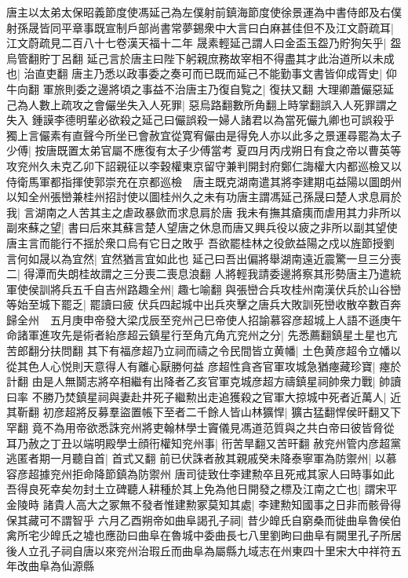 唐主以太弟太保昭義節度使馮延己為左僕射前鎮海節度使徐景運為中書侍郎及右僕射孫晟皆同平章事既宣制戶部尚書常夢錫衆中大言曰白麻甚佳但不及江文蔚疏耳|{
	江文蔚疏見二百八十七卷漢天福十二年}
晟素輕延己謂人曰金盃玉盌乃貯狗矢乎|{
	盌烏管翻貯丁呂翻}
延己言於唐主曰陛下躬親庶務故宰相不得盡其才此治道所以未成也|{
	治直吏翻}
唐主乃悉以政事委之奏可而已既而延己不能勤事文書皆仰成胥史|{
	仰牛向翻}
軍旅則委之邊將頃之事益不治唐主乃復自覧之|{
	復扶又翻}
大理卿蕭儼惡延己為人數上疏攻之會儼坐失入人死罪|{
	惡烏路翻數所角翻上時掌翻誤入人死罪謂之失入}
鍾謨李德明輩必欲殺之延己曰儼誤殺一婦人諸君以為當死儼九卿也可誤殺乎獨上言儼素有直聲今所坐已會赦宜從寛宥儼由是得免人亦以此多之景運尋罷為太子少傅|{
	按唐既置太弟官屬不應復有太子少傅當考}
夏四月丙戌朔日有食之帝以曹英等攻兖州久未克乙卯下詔親征以李穀權東京留守兼判開封府鄭仁誨權大内都巡檢又以侍衛馬軍都指揮使郭崇充在京都巡檢　唐主既克湖南遣其將李建期屯益陽以圖朗州以知全州張巒兼桂州招討使以圖桂州久之未有功唐主謂馮延己孫晟曰楚人求息肩於我|{
	言湖南之人苦其主之虐政暴歛而求息肩於唐}
我未有撫其瘡痍而虐用其力非所以副來蘇之望|{
	書曰后來其蘇言楚人望唐之休息而唐又興兵役以疲之非所以副其望使唐主言而能行不揺於衆口烏有它日之敗乎}
吾欲罷桂林之役歛益陽之戍以旌節授劉言何如晟以為宜然|{
	宜然猶言宜如此也}
延己曰吾出偏將舉湖南遠近震驚一旦三分喪二|{
	得潭而失朗桂故謂之三分喪二喪息浪翻}
人將輕我請委邊將察其形勢唐主乃遣統軍使侯訓將兵五千自吉州路趣全州|{
	趣七喻翻}
與張巒合兵攻桂州南漢伏兵於山谷巒等始至城下罷乏|{
	罷讀曰疲}
伏兵四起城中出兵夾擊之唐兵大敗訓死巒收散卒數百奔歸全州　五月庚申帝發大梁戊辰至兖州己巳帝使人招諭慕容彦超城上人語不遜庚午命諸軍進攻先是術者紿彦超云鎮星行至角亢角亢兖州之分|{
	先悉薦翻鎮星土星也亢苦郎翻分扶問翻}
其下有福彦超乃立祠而禱之令民間皆立黄幡|{
	土色黄彦超令立幡以從其色人心悦則天意得人有離心厭勝何益}
彦超性貪吝官軍攻城急猶瘞藏珍寶|{
	瘞於計翻}
由是人無鬬志將卒相繼有出降者乙亥官軍克城彦超方禱鎮星祠帥衆力戰|{
	帥讀曰率}
不勝乃焚鎮星祠與妻赴井死子繼勲出走追獲殺之官軍大掠城中死者近萬人|{
	近其靳翻}
初彦超將反募羣盜置帳下至者二千餘人皆山林獷悍|{
	獷古猛翻悍侯旰翻又下罕翻}
竟不為用帝欲悉誅兖州將吏翰林學士竇儀見馮道范質與之共白帝曰彼皆脅從耳乃赦之丁丑以端明殿學士顔衎權知兖州事|{
	衎苦旱翻又苦旰翻}
赦兖州管内彦超黨逃匿者期一月聽自首|{
	首式又翻}
前已伏誅者赦其親戚癸未降泰寧軍為防禦州|{
	以慕容彦超據兖州拒命降節鎮為防禦州}
唐司徒致仕李建勲卒且死戒其家人曰時事如此吾得良死幸矣勿封土立碑聽人耕種於其上免為他日開發之標及江南之亡也|{
	謂宋平金陵時}
諸貴人高大之冢無不發者惟建勲冢莫知其處|{
	李建勲知國事之日非而骸骨得保其藏可不謂智乎}
六月乙酉朔帝如曲阜謁孔子祠|{
	昔少皥氏自窮桑而徙曲阜魯侯伯禽所宅少皥氏之墟也應劭曰曲阜在魯城中委曲長七八里劉昫曰曲阜有闕里孔子所居後人立孔子祠自唐以來兖州治瑕丘而曲阜為屬縣九域志在州東四十里宋大中祥符五年改曲阜為仙源縣}
